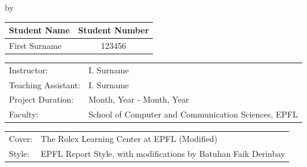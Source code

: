 \begin{titlepage}

\begin{center}

\vspace{50mm}

{\makeatletter
\largetitlestyle\fontsize{45}{45}\selectfont\@title
\makeatother}

{\makeatletter
\ifdefvoid{\@subtitle}{}{\bigskip\fontsize{20}{20}\selectfont\@subtitle}
\makeatother}

\bigskip
\bigskip

by

\bigskip
\bigskip

{\makeatletter
\largetitlestyle\fontsize{25}{25}\selectfont\@author
\makeatother}

\bigskip
\bigskip

\setlength\extrarowheight{2pt}
\begin{tabular}{lc}
    Student Name & Student Number \\\midrule
    First Surname & 123456 \\
\end{tabular}

\vfill

\begin{tabular}{ll}
    Instructor: & I. Surname \\
    Teaching Assistant: & I. Surname \\
    Project Duration: & Month, Year - Month, Year \\
    Faculty: & School of Computer and Communication Sciences, EPFL
\end{tabular}

\vfill

\begin{tabular}{p{15mm}p{10cm}}
    Cover: & The Rolex Learning Center at EPFL (Modified) \\
    Style: & EPFL Report Style, with modifications by Batuhan Faik Derinbay
\end{tabular}

\end{center}

\end{titlepage}
